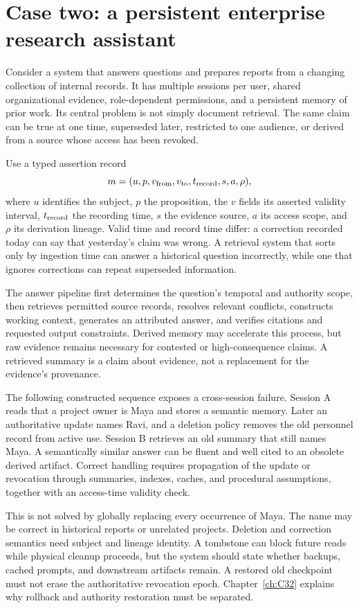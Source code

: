 \section{Case two: a persistent enterprise research assistant}\label{sec:C33:04}
Consider a system that answers questions and prepares reports from a changing collection of internal records. It has multiple sessions per user, shared organizational evidence, role-dependent permissions, and a persistent memory of prior work. Its central problem is not simply document retrieval. The same claim can be true at one time, superseded later, restricted to one audience, or derived from a source whose access has been revoked.

Use a typed assertion record
\begin{equation}
 m=(u,p,v_{\rm from},v_{\rm to},t_{\rm record},s,a,\rho),
\end{equation}
where $u$ identifies the subject, $p$ the proposition, the $v$ fields its asserted validity interval, $t_{\rm record}$ the recording time, $s$ the evidence source, $a$ its access scope, and $\rho$ its derivation lineage. Valid time and record time differ: a correction recorded today can say that yesterday's claim was wrong. A retrieval system that sorts only by ingestion time can answer a historical question incorrectly, while one that ignores corrections can repeat superseded information.

The answer pipeline first determines the question's temporal and authority scope, then retrieves permitted source records, resolves relevant conflicts, constructs working context, generates an attributed answer, and verifies citations and requested output constraints. Derived memory may accelerate this process, but raw evidence remains necessary for contested or high-consequence claims. A retrieved summary is a claim about evidence, not a replacement for the evidence's provenance.

The following constructed sequence exposes a cross-session failure. Session A reads that a project owner is Maya and stores a semantic memory. Later an authoritative update names Ravi, and a deletion policy removes the old personnel record from active use. Session B retrieves an old summary that still names Maya. A semantically similar answer can be fluent and well cited to an obsolete derived artifact. Correct handling requires propagation of the update or revocation through summaries, indexes, caches, and procedural assumptions, together with an access-time validity check.

This is not solved by globally replacing every occurrence of Maya. The name may be correct in historical reports or unrelated projects. Deletion and correction semantics need subject and lineage identity. A tombstone can block future reads while physical cleanup proceeds, but the system should state whether backups, cached prompts, and downstream artifacts remain. A restored old checkpoint must not erase the authoritative revocation epoch. Chapter~\ref{ch:C32} explains why rollback and authority restoration must be separated.

